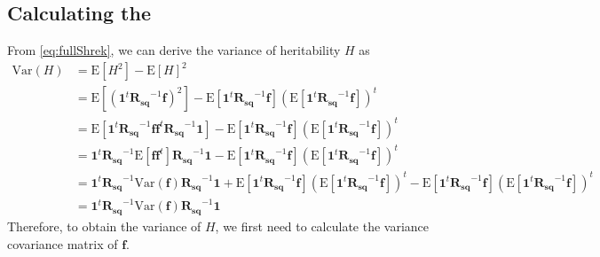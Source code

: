 		\subsection{Calculating the }
			From \cref{eq:fullShrek}, we can derive the variance of heritability $H$ as 
			\begin{align}
				\mathrm{Var}(H) &= \mathrm{E}[H^2]-\mathrm{E}[H]^2\nonumber\\
				&=\mathrm{E}[(\boldsymbol{1}^t\boldsymbol{R_{sq}}^{-1}\boldsymbol{f})^2]-\mathrm{E}[\boldsymbol{1}^t\boldsymbol{R_{sq}}^{-1}\boldsymbol{f}](\mathrm{E}[\boldsymbol{1}^t\boldsymbol{R_{sq}}^{-1}\boldsymbol{f}])^t \nonumber \\
				&=\mathrm{E}[\boldsymbol{1}^t\boldsymbol{R_{sq}}^{-1}\boldsymbol{ff}^t\boldsymbol{R_{sq}}^{-1}\boldsymbol{1}]-\mathrm{E}[\boldsymbol{1}^t\boldsymbol{R_{sq}}^{-1}\boldsymbol{f}](\mathrm{E}[\boldsymbol{1}^t\boldsymbol{R_{sq}}^{-1}\boldsymbol{f}])^t \nonumber \\
				&=\boldsymbol{1}^t\boldsymbol{R_{sq}}^{-1}\mathrm{E}[\boldsymbol{ff}^t]\boldsymbol{R_{sq}}^{-1}\boldsymbol{1}-\mathrm{E}[\boldsymbol{1}^t\boldsymbol{R_{sq}}^{-1}\boldsymbol{f}](\mathrm{E}[\boldsymbol{1}^t\boldsymbol{R_{sq}}^{-1}\boldsymbol{f}])^t \nonumber \\
				&=\boldsymbol{1}^t\boldsymbol{R_{sq}}^{-1}\mathrm{Var}(\boldsymbol{f})\boldsymbol{R_{sq}}^{-1}\boldsymbol{1}+\mathrm{E}[\boldsymbol{1}^t\boldsymbol{R_{sq}}^{-1}\boldsymbol{f}](\mathrm{E}[\boldsymbol{1}^t\boldsymbol{R_{sq}}^{-1}\boldsymbol{f}])^t-\mathrm{E}[\boldsymbol{1}^t\boldsymbol{R_{sq}}^{-1}\boldsymbol{f}](\mathrm{E}[\boldsymbol{1}^t\boldsymbol{R_{sq}}^{-1}\boldsymbol{f}])^t \nonumber\\
				&=\boldsymbol{1}^t\boldsymbol{R_{sq}}^{-1}\mathrm{Var}(\boldsymbol{f})\boldsymbol{R_{sq}}^{-1}\boldsymbol{1}
				\label{eq:varHvarf}
			\end{align}
			Therefore, to obtain the variance of $H$, we first need to calculate the variance covariance matrix of $\boldsymbol{f}$.
			
